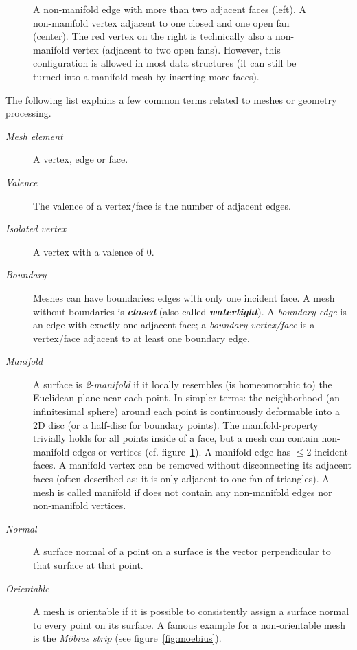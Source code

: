 \begin{figure}[t]
  
  \caption{
    A non-manifold edge with more than two adjacent faces (left).
    A non-manifold vertex adjacent to one closed and one open fan (center).
    The red vertex on the right is technically also a non-manifold vertex (adjacent to two open fans).
    However, this configuration is allowed in most data structures (it can still be turned into a manifold mesh by inserting more faces).}
  \label{fig:non-manifold}
\end{figure}

The following list explains a few common terms related to meshes or geometry processing.

\begin{description}
  \item [\emph{Mesh element}] A vertex, edge or face.
  \item [\emph{Valence}] The valence of a vertex/face is the number of adjacent edges.
  \item [\emph{Isolated vertex}] A vertex with a valence of 0.
  \item [\emph{Boundary}] Meshes can have boundaries: edges with only one incident face.
  A mesh without boundaries is \textbf{\emph{closed}} (also called \textbf{\emph{watertight}}).
  A \emph{boundary edge} is an edge with exactly one adjacent face; a \emph{boundary vertex/face} is a vertex/face adjacent to at least one boundary edge.
  \item [\emph{Manifold}] A surface is \emph{2-manifold} if it locally resembles (is homeomorphic to) the Euclidean plane near each point.
  In simpler terms: the neighborhood (an infinitesimal sphere) around each point is continuously deformable into a 2D disc (or a half-disc for boundary points).
  The manifold-property trivially holds for all points inside of a face, but a mesh can contain non-manifold edges or vertices (cf. figure~\ref{fig:non-manifold}).
  A manifold edge has $\le 2$ incident faces.
  A manifold vertex can be removed without disconnecting its adjacent faces (often described as: it is only adjacent to one fan of triangles).
  A mesh is called manifold if does not contain any non-manifold edges nor non-manifold vertices.
  \item [\emph{Normal}] A surface normal of a point on a surface is the vector perpendicular to that surface at that point.
  \item [\emph{Orientable}] A mesh is orientable if it is possible to consistently assign a surface normal to every point on its surface.
  A famous example for a non-orientable mesh is the \emph{Möbius strip} (see figure~\ref{fig:moebius}).
\end{description}

